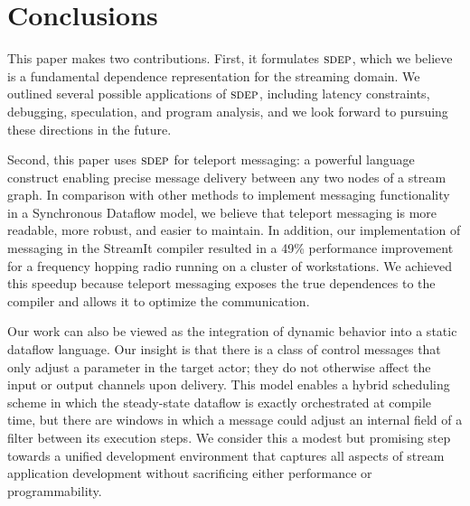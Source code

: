 \section{Conclusions}

This paper makes two contributions.  First, it formulates $\textsc{sdep}$,
which we believe is a fundamental dependence representation for the
streaming domain.  We outlined several possible applications of
$\textsc{sdep}$, including latency constraints, debugging, speculation, and
program analysis, and we look forward to pursuing these directions in
the future.

Second, this paper uses $\textsc{sdep}$ for teleport messaging: a powerful
language construct enabling precise message delivery between any two
nodes of a stream graph.  In comparison with other methods to
implement messaging functionality in a Synchronous Dataflow model, we
believe that teleport messaging is more readable, more robust, and
easier to maintain.  In addition, our implementation of messaging in
the StreamIt compiler resulted in a 49\% performance improvement for a
frequency hopping radio running on a cluster of workstations.  We
achieved this speedup because teleport messaging exposes the true
dependences to the compiler and allows it to optimize the
communication.

Our work can also be viewed as the integration of dynamic behavior
into a static dataflow language.  Our insight is that there is a class
of control messages that only adjust a parameter in the target actor;
they do not otherwise affect the input or output channels upon
delivery.  This model enables a hybrid scheduling scheme in which the
steady-state dataflow is exactly orchestrated at compile time, but
there are windows in which a message could adjust an internal field of
a filter between its execution steps.  We consider this a modest
but promising step towards a unified development environment that
captures all aspects of stream application development without
sacrificing either performance or programmability.
